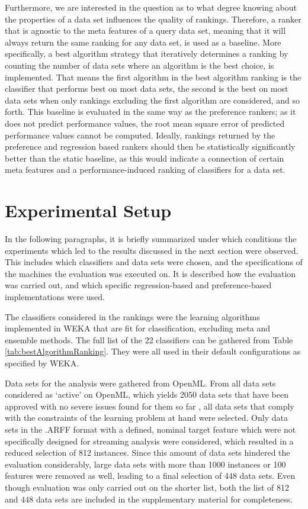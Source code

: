 Furthermore, we are interested in the question as to what degree knowing about the properties of a data set influences the quality of rankings. Therefore, a ranker that is agnostic to the meta features of a query data set, meaning that it will always return the same ranking for any data set, is used as a baseline. More specifically, a best algorithm strategy that iteratively determines a ranking by counting the number of data sets where an algorithm is the best choice, is implemented. That means the first algorithm in the best algorithm ranking is the classifier that performs best on most data sets, the second is the best on most data sets when only rankings excluding the first algorithm are considered, and so forth. This baseline is evaluated in the same way as the preference rankers; as it does not predict performance values, the root mean square error of predicted performance values cannot be computed. Ideally, rankings returned by the preference and regression based rankers should then be statistically significantly better than the static baseline, as this would indicate a connection of certain meta features and a performance-induced ranking of classifiers for a data set. 

\section{Experimental Setup}
In the following paragraphs, it is briefly summarized under which conditions the experiments which led to the results discussed in the next section were observed. This includes which classifiers and data sets were chosen, and the specifications of the machines the evaluation was executed on. It is described how the evaluation was carried out, and which specific regression-based and preference-based implementations were used.

The classifiers considered in the rankings were the learning algorithms implemented in WEKA that are fit for classification, excluding meta and ensemble methods. The full list of the 22 classifiers can be gathered from Table \ref{tab:bestAlgorithmRanking}. They were all used in their default configurations as specified by WEKA. 

Data sets for the analysis were gathered from OpenML. From all data sets considered as `active' on OpenML, which yields 2050 data sets that have been approved with no severe issues found for them so far \cite{openMLGuide}, all data sets that comply with the constraints of the learning problem at hand were selected. Only data sets in the .ARFF format with a defined, nominal target feature which were not specifically designed for streaming analysis\footnotemark{} were considered, which resulted in a reduced selection of 812 instances. Since this amount of data sets hindered the evaluation considerably, large data sets with more than 1000 instances or 100 features were removed as well, leading to a final selection of 448 data sets. Even though evaluation was only carried out on the shorter list, both the list of 812 and 448 data sets are included in the supplementary material for completeness.

